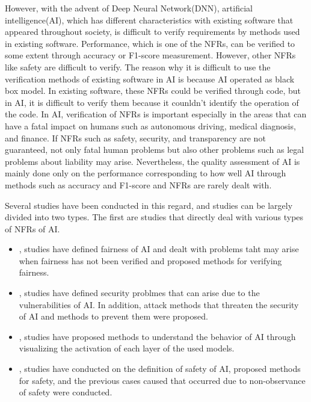 \documentclass[journal,article,submit,moreauthors,pdftex]{Definitions/mdpi}
\begin{document}
However, with the advent of Deep Neural Network(DNN), artificial intelligence(AI), which has different characteristics with existing software that appeared throughout society, is difficult to verify requirements by methods used in existing software.
Performance, which is one of the NFRs, can be verified to some extent through accuracy or F1-score measurement. However, other NFRs like safety are difficult to verify.
The reason why it is difficult to use the verification methods of existing software in AI is because AI operated as black box model. In existing software, these NFRs could be verified through code, but in AI, it is difficult to verify them because it counldn't identify the operation of the code.
In AI, verification of NFRs is important especially in the areas that can have a fatal impact on humans such as autonomous driving\cite{ai-driving-bajarski,ai-driving-levinson}, medical diagnosis\cite{ai-medical-ramsundar,ai-medical-vieira,ai-medical-xai-holzinger,ai-medical-krause,ai-medical-tan,ai-medical-pesapane,ai-medical-miller}, and finance\cite{ai-finance-fu}.
If NFRs such as safety, security, and transparency are not guaranteed, not only fatal human problems but also other problems such as legal problems about liability may arise.
Nevertheless, the quality assessment of AI is mainly done only on the performance corresponding to how well AI through methods such as accuracy and F1-score and NFRs are rarely dealt with.

Several studies have been conducted in this regard, and studies can be largely divided into two types.
The first are studies that directly deal with various types of NFRs of AI.

\begin{itemize}
    \item \cite{fairness-dwork, fairness-feldman, fairness-tramer, fairness-zhang, fairness-zemel}, studies have defined fairness of AI and dealt with problems taht may arise when fairness has not been verified and proposed methods for verifying fairness.
    \item \cite{security-barreno,security-mei,security-mei2}, studies have defined security problmes that can arise due to the vulnerabilities of AI. In addition, attack methods that threaten the security of AI and methods to prevent them were proposed.
    \item \cite{transparency-yosinski}, studies have proposed methods to understand the behavior of AI through visualizing the activation of each layer of the used models.
    \item \cite{safety-amodei,safety-juric,safety-leike}, studies have conducted on the definition of safety of AI, proposed methods for safety, and the previous cases caused that occurred due to non-observance of safety were conducted.
\end{itemize}
\end{document}
